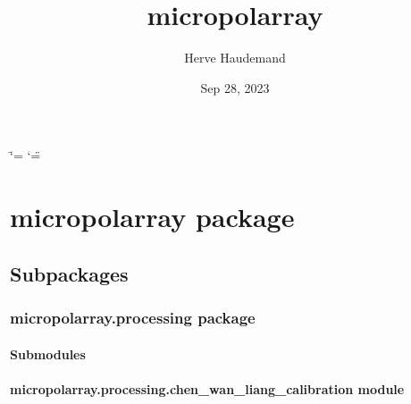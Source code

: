 \documentclass[letterpaper,10pt,english]{sphinxmanual}
\title{micropolarray}
\date{Sep 28, 2023}
\author{Herve Haudemand}
\begin{document}
\ifdefined\shorthandoff
  \ifnum\catcode`\=\string=\active\shorthandoff{=}\fi
  \ifnum\catcode`\"=\active{}\fi
\fi

\pagestyle{empty}
\sphinxmaketitle
\pagestyle{plain}
\sphinxtableofcontents
\pagestyle{normal}
\label{\detokenize{index::doc}}


\sphinxstepscope


\chapter{micropolarray package}
\label{\detokenize{micropolarray:micropolarray-package}}\label{\detokenize{micropolarray::doc}}

\section{Subpackages}
\label{\detokenize{micropolarray:subpackages}}
\sphinxstepscope


\subsection{micropolarray.processing package}
\label{\detokenize{micropolarray.processing:micropolarray-processing-package}}\label{\detokenize{micropolarray.processing::doc}}

\subsubsection{Submodules}
\label{\detokenize{micropolarray.processing:submodules}}

\subsubsection{micropolarray.processing.chen\_wan\_liang\_calibration module}
\label{\detokenize{micropolarray.processing:module-micropolarray.processing.chen_wan_liang_calibration}}\label{\detokenize{micropolarray.processing:micropolarray-processing-chen-wan-liang-calibration-module}}
\end{document}
